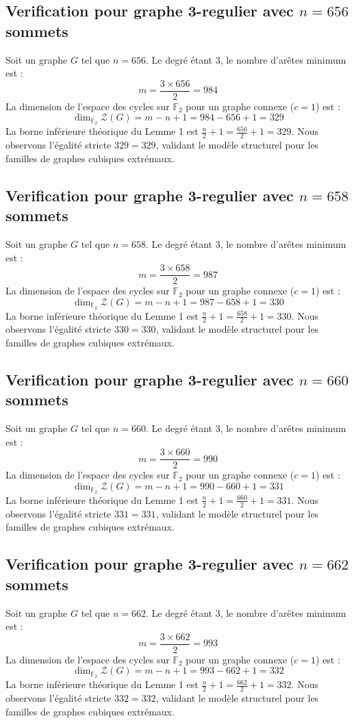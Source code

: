 \documentclass[11pt,a4paper]{article}
\begin{document}
\subsection{Verification pour graphe 3-regulier avec $n=656$ sommets}
Soit un graphe $G$ tel que $n = 656$. Le degré étant 3, le nombre d'arêtes minimum est :
$$ m = \frac{3 \times 656}{2} = 984 $$
La dimension de l'espace des cycles sur $\mathbb{F}_2$ pour un graphe connexe ($c=1$) est :
$$ \dim_{\mathbb{F}_2} \mathcal{Z}(G) = m - n + 1 = 984 - 656 + 1 = 329 $$
La borne inférieure théorique du Lemme 1 est $\frac{n}{2} + 1 = \frac{656}{2} + 1 = 329$.
Nous observons l'égalité stricte $329 = 329$, validant le modèle structurel pour les familles de graphes cubiques extrémaux.

\subsection{Verification pour graphe 3-regulier avec $n=658$ sommets}
Soit un graphe $G$ tel que $n = 658$. Le degré étant 3, le nombre d'arêtes minimum est :
$$ m = \frac{3 \times 658}{2} = 987 $$
La dimension de l'espace des cycles sur $\mathbb{F}_2$ pour un graphe connexe ($c=1$) est :
$$ \dim_{\mathbb{F}_2} \mathcal{Z}(G) = m - n + 1 = 987 - 658 + 1 = 330 $$
La borne inférieure théorique du Lemme 1 est $\frac{n}{2} + 1 = \frac{658}{2} + 1 = 330$.
Nous observons l'égalité stricte $330 = 330$, validant le modèle structurel pour les familles de graphes cubiques extrémaux.

\subsection{Verification pour graphe 3-regulier avec $n=660$ sommets}
Soit un graphe $G$ tel que $n = 660$. Le degré étant 3, le nombre d'arêtes minimum est :
$$ m = \frac{3 \times 660}{2} = 990 $$
La dimension de l'espace des cycles sur $\mathbb{F}_2$ pour un graphe connexe ($c=1$) est :
$$ \dim_{\mathbb{F}_2} \mathcal{Z}(G) = m - n + 1 = 990 - 660 + 1 = 331 $$
La borne inférieure théorique du Lemme 1 est $\frac{n}{2} + 1 = \frac{660}{2} + 1 = 331$.
Nous observons l'égalité stricte $331 = 331$, validant le modèle structurel pour les familles de graphes cubiques extrémaux.

\subsection{Verification pour graphe 3-regulier avec $n=662$ sommets}
Soit un graphe $G$ tel que $n = 662$. Le degré étant 3, le nombre d'arêtes minimum est :
$$ m = \frac{3 \times 662}{2} = 993 $$
La dimension de l'espace des cycles sur $\mathbb{F}_2$ pour un graphe connexe ($c=1$) est :
$$ \dim_{\mathbb{F}_2} \mathcal{Z}(G) = m - n + 1 = 993 - 662 + 1 = 332 $$
La borne inférieure théorique du Lemme 1 est $\frac{n}{2} + 1 = \frac{662}{2} + 1 = 332$.
Nous observons l'égalité stricte $332 = 332$, validant le modèle structurel pour les familles de graphes cubiques extrémaux.
\end{document}
